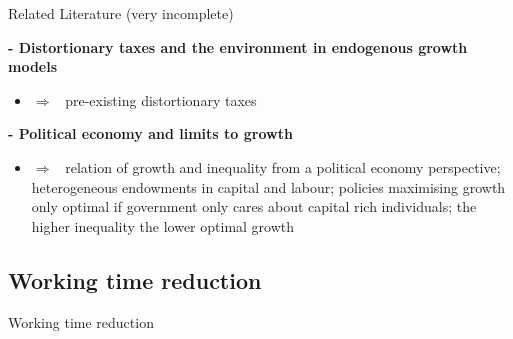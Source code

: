 \documentclass[11pt,aspectratio=169]{beamer}
\newcommand{\ar}{$\Rightarrow$ \ }
\begin{document}
\begin{frame}{Related Literature (very incomplete)}

\textbf{- Distortionary taxes and the environment in endogenous growth models}
\begin{itemize}
	\item \citet[Journal of Public Economics]{Bovenberg1997EnvironmentalGrowth} \ar pre-existing distortionary taxes
\end{itemize}

\textbf{ - Political economy and limits to growth}
\begin{itemize}
\item \citet[QJE]{Alesina1994DistributiveGrowth}
\ar relation of growth and inequality from a political economy perspective; heterogeneous endowments in capital and labour; policies maximising growth only optimal if government only cares about capital rich individuals; the higher inequality the lower optimal growth
\end{itemize}


\end{frame}


\subsection{Working time reduction}

\begingroup
{}
\begin{frame}
	\huge{Working time reduction}
\end{frame}
\endgroup
\end{document}
